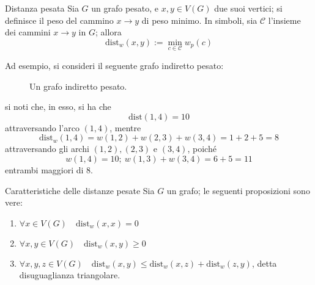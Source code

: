 \documentclass[a4paper, 12pt]{report}
\begin{document}
    \begin{frameddefn}{Distanza pesata}
        Sia $G$ un grafo pesato, e $x, y \in V(G)$ due suoi vertici; si definisce  il peso del cammino $x \rightarrow y$ di peso minimo. In simboli, sia $\mathcal{C}$ l'insieme dei cammini $x \rightarrow y$ in $G$; allora $$\mathrm{dist}_w(x, y) := \min_{c \in \mathcal{C}}{w_p(c)}$$
    \end{frameddefn}

    \begin{example}
        Ad esempio, si consideri il seguente grafo indiretto pesato:

        \begin{figure}[H]
            \centering
            \caption{Un grafo indiretto pesato.}
        \end{figure}

        si noti che, in esso, si ha che $$\mathrm{dist}(1, 4) = 10$$ attraversando l'arco $(1, 4)$, mentre $$\mathrm{dist}_w(1, 4)=w(1, 2) + w(2, 3) + w(3, 4)=1 + 2 + 5 = 8$$ attraversando gli archi $(1, 2), (2, 3)$ e $(3, 4)$, poiché $$w(1, 4) = 10; \ w(1, 3) + w(3, 4) = 6 + 5 = 11$$ entrambi maggiori di $8$.
    \end{example}

    \begin{framedlem}[label={caratteristiche distanze pesate}]{Caratteristiche delle distanze pesate}
        Sia $G$ un grafo; le seguenti proposizioni sono vere:

        \begin{enumerate}[label=\roman*), font=\itshape]
            \item $\forall x \in V(G) \quad \mathrm{dist}_w(x, x) = 0$
            \item $\forall x, y \in V(G) \quad \mathrm{dist}_w(x, y) \ge 0$
            \item $\forall x, y, z \in V(G) \quad \mathrm{dist}_w(x, y) \le \mathrm{dist}_w(x, z) + \mathrm{dist}_w(z, y)$, detta \textup{disuguaglianza triangolare}.
        \end{enumerate}
    \end{framedlem}
\end{document}
